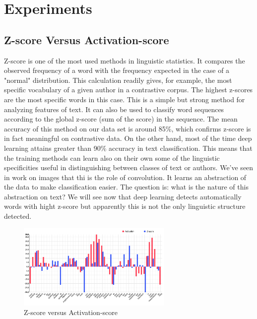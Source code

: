 \section{Experiments}

\subsection{Z-score Versus Activation-score}

Z-score is one of the most used methods in linguistic statistics. It compares the observed frequency of a word with the frequency expected in the case of a "normal" distribution. This calculation readily gives, for example, the most specific vocabulary of a given author in a contrastive corpus. The highest z-scores are the most specific words in this case. This is a simple but strong method for analyzing features of text. It can also be used to classify word sequences according to the global z-score (sum of the score) in the sequence. The mean accuracy of this method on our data set is around 85\%, which confirms z-score is in fact meaningful on contrastive data. On the other hand, most of the time deep learning attains greater than 90\% accuracy in text classification. This means that the training methods can learn also on their own some of the linguistic specificities useful in distinguishing between classes of text or authors. We've seen in work on images that thi is the role of convolution. It learns an abstraction of the data to make classification easier. The question is: what is the nature of this abstraction on text? We will see now that deep learning detects automatically words with hight z-score but apparently this is not the only linguistic structure detected.

\begin{figure}[h]
\begin{center}
\includegraphics[width=7.5cm]{img/z-score_activations.png}
\caption{Z-score versus Activation-score}
\label{comparision}
\end{center}
\end{figure}

